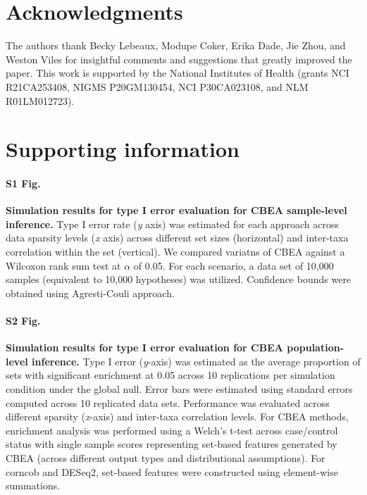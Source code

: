 \documentclass[10pt,letterpaper]{article}
\begin{document}
\section*{Acknowledgments}
The authors thank Becky Lebeaux, Modupe Coker, Erika Dade, Jie Zhou, and Weston Viles for insightful comments and suggestions that greatly improved the paper. This work is supported by the National Institutes of Health (grants NCI R21CA253408, NIGMS P20GM130454, NCI P30CA023108, and NLM R01LM012723). 

\nolinenumbers
%
%
% 

{}


\section*{Supporting information}

\paragraph*{S1 Fig.}
\label{S1_Fig}
{\bf Simulation results for type I error evaluation for CBEA sample-level inference.} Type I error rate (\emph{y} axis) was estimated for each approach across data sparsity levels (\emph{x} axis) across different set sizes (horizontal) and inter-taxa correlation within the set (vertical). We compared variatns of CBEA against a Wilcoxon rank sum test at $\alpha$ of 0.05. For each scenario, a data set of 10,000 samples (equivalent to 10,000 hypotheses) was utilized. Confidence bounds were obtained using Agresti-Couli approach.

\paragraph*{S2 Fig.}
\label{S2_Fig}
{\bf Simulation results for type I error evaluation for CBEA population-level inference.} Type I error (\emph{y}-axis) was estimated as the average proportion of sets with significant enrichment at 0.05 across 10 replications per simulation condition under the global null. Error bars were estimated using standard errors computed across 10 replicated data sets. Performance was evaluated across different sparsity (\emph{x}-axis) and inter-taxa correlation levels. For CBEA methods, enrichment analysis was performed using a Welch's t-test across case/control status with single sample scores representing set-based features generated by CBEA (across different output types and distributional assumptions). For corncob and DESeq2, set-based features were constructed using element-wise summations.
\end{document}

